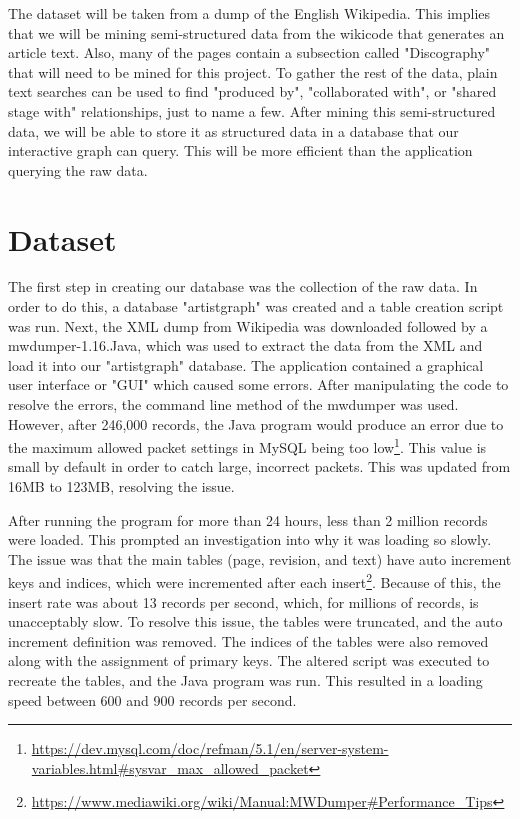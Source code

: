 \documentclass{sig-alternate}
\begin{document}
The dataset will be taken from a dump of the English Wikipedia. This implies 
that we will be mining semi-structured data from the wikicode that generates an 
article text. Also, many of the pages contain a subsection called "Discography" 
that will need to be mined for this project. To gather the rest of the data, 
plain text searches can be used to find "produced by", "collaborated with", 
or "shared stage with" relationships, just to name a few. After mining this 
semi-structured data, we will be able to store it as structured data in a database 
that our interactive graph can query. This will be more efficient than the 
application querying the raw data. 


\section{Dataset}
\label{dataset}

The first step in creating our database was the collection of the raw data.
In order to do this, a database "artistgraph" was created and a table creation
script was run. Next, the XML dump from Wikipedia was downloaded followed by a
mwdumper-1.16.Java, which was used to extract the data from the XML and load it
into our "artistgraph" database. The application contained a graphical user interface
or "GUI" which caused some errors. After manipulating the code to resolve the errors,
the command line method of the mwdumper was used. However, after 246,000 records, the 
Java program would produce an error due to the maximum allowed packet settings in MySQL
being too low\footnote{\url{https://dev.mysql.com/doc/refman/5.1/en/server-system-variables.html#sysvar_max_allowed_packet}}.
This value is small by default in order to catch large, incorrect packets.
This was updated from 16MB to 123MB, resolving the issue.

After running the program
for more than 24 hours, less than 2 million records were loaded. This prompted an 
investigation into why it was loading so slowly. The issue was that the main tables 
(page, revision, and text) have auto increment keys and indices, which were incremented after each insert\footnote{\url{https://www.mediawiki.org/wiki/Manual:MWDumper#Performance_Tips}}.
Because of this, the insert rate was about 13 records per second, which, for
millions of records, is unacceptably slow. To resolve this issue, the tables
were truncated, and the auto increment definition was removed. The indices
of the tables were also removed along with the assignment of primary keys. The altered
script was executed to recreate the tables, and the Java program was run. This resulted
in a loading speed between 600 and 900 records per second. 
\end{document}
